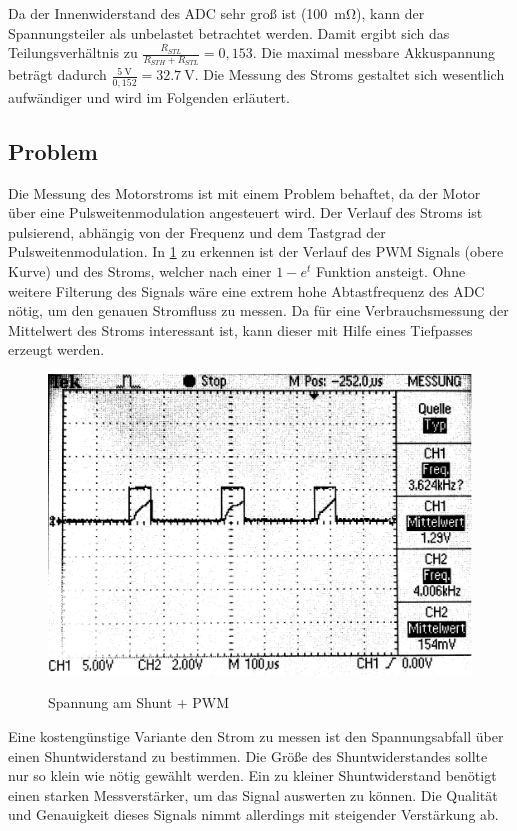Da der Innenwiderstand des ADC sehr groß ist (\SI{100}{\mohm}), kann der Spannungsteiler als unbelastet betrachtet werden. Damit ergibt sich das Teilungsverhältnis zu $\frac{R_{STL}}{R_{STH}+R_{STL}}=0,153$.
Die maximal messbare Akkuspannung beträgt dadurch $\frac{\SI{5}{\V}}{0,152}=\SI{32,7}{\V}$. Die Messung des Stroms gestaltet sich wesentlich aufwändiger und wird im Folgenden erläutert.




\subsection{Problem}

Die Messung des Motorstroms ist mit einem Problem behaftet, da der Motor über eine Pulsweitenmodulation angesteuert wird. Der Verlauf des Stroms ist pulsierend, abhängig von
der Frequenz und dem Tastgrad der Pulsweitenmodulation. In \cref{fig:pwm+i_0} zu erkennen ist der Verlauf des PWM Signals (obere Kurve) und des Stroms, welcher nach einer $1-e^t$ Funktion ansteigt.
Ohne weitere Filterung des Signals wäre eine extrem hohe Abtastfrequenz des ADC nötig, um den genauen Stromfluss zu messen. Da für eine Verbrauchsmessung 
der Mittelwert des Stroms interessant ist, kann dieser mit Hilfe eines Tiefpasses erzeugt werden.


\begin{figure}[H]
\centering
\includegraphics[width=.8\textwidth]{oszi.png}\\
\caption{Spannung am Shunt + PWM}%
\label{fig:pwm+i_0}
\end{figure}

Eine kostengünstige Variante den Strom zu messen ist den Spannungsabfall über einen Shuntwiderstand zu bestimmen. Die Größe des Shuntwiderstandes sollte nur so klein wie nötig gewählt werden.
Ein zu kleiner Shuntwiderstand benötigt einen starken Messverstärker, um das Signal auswerten zu können. Die Qualität und Genauigkeit dieses Signals nimmt allerdings mit steigender Verstärkung ab.

